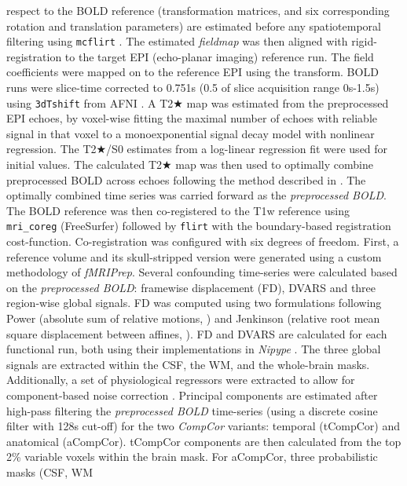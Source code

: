 \documentclass[
]{article}
\begin{document}
\begin{description}
respect to the BOLD reference (transformation matrices, and six
corresponding rotation and translation parameters) are estimated before
any spatiotemporal filtering using \texttt{mcflirt} \citep[FSL
,][]{mcflirt}. The estimated \emph{fieldmap} was then aligned with
rigid-registration to the target EPI (echo-planar imaging) reference
run. The field coefficients were mapped on to the reference EPI using
the transform. BOLD runs were slice-time corrected to 0.751s (0.5 of
slice acquisition range 0s-1.5s) using \texttt{3dTshift} from AFNI
\citep[RRID:SCR\_005927]{afni}. A T2★ map was estimated from the
preprocessed EPI echoes, by voxel-wise fitting the maximal number of
echoes with reliable signal in that voxel to a monoexponential signal
decay model with nonlinear regression. The T2★/S0 estimates from a
log-linear regression fit were used for initial values. The calculated
T2★ map was then used to optimally combine preprocessed BOLD across
echoes following the method described in \citep{posse_t2s}. The
optimally combined time series was carried forward as the
\emph{preprocessed BOLD}. The BOLD reference was then co-registered to
the T1w reference using \texttt{mri\_coreg} (FreeSurfer) followed by
\texttt{flirt} \citep[FSL ,][]{flirt} with the boundary-based
registration \citep{bbr} cost-function. Co-registration was configured
with six degrees of freedom. First, a reference volume and its
skull-stripped version were generated using a custom methodology of
\emph{fMRIPrep}. Several confounding time-series were calculated based
on the \emph{preprocessed BOLD}: framewise displacement (FD), DVARS and
three region-wise global signals. FD was computed using two formulations
following Power (absolute sum of relative motions,
\citet{power_fd_dvars}) and Jenkinson (relative root mean square
displacement between affines, \citet{mcflirt}). FD and DVARS are
calculated for each functional run, both using their implementations in
\emph{Nipype} \citep[following the definitions by][]{power_fd_dvars}.
The three global signals are extracted within the CSF, the WM, and the
whole-brain masks. Additionally, a set of physiological regressors were
extracted to allow for component-based noise correction
\citep[\emph{CompCor},][]{compcor}. Principal components are estimated
after high-pass filtering the \emph{preprocessed BOLD} time-series
(using a discrete cosine filter with 128s cut-off) for the two
\emph{CompCor} variants: temporal (tCompCor) and anatomical (aCompCor).
tCompCor components are then calculated from the top 2\% variable voxels
within the brain mask. For aCompCor, three probabilistic masks (CSF, WM

\end{description}
\end{document}
